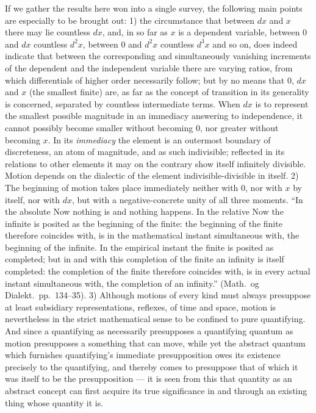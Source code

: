 \documentclass[12pt,a4paper]{book}
\begin{document}
If we gather the results here won into a single survey, the following main
points are especially to be brought out: 1) the
circumstance that between $dx$ and $x$ there may lie countless $dx$,
and, in so far as $x$ is a dependent variable, between $0$ and $dx$
countless $d^2x$, between $0$ and $d^2x$ countless $d^3x$ and so on,
does indeed indicate that between the corresponding and simultaneously
vanishing increments of the dependent and the independent variable
there are varying ratios, from which differentials of higher
order necessarily follow; but by no means that $0$,
$dx$ and $x$ (the smallest finite) are, as far as the concept of transition
in its generality is concerned, separated by countless
intermediate terms. When $dx$ is to represent the smallest possible magnitude
in an immediacy answering to independence, it cannot possibly become smaller
without becoming $0$, nor greater without becoming $x$. In its
\emph{immediacy} the element is an outermost boundary of discreteness, an atom
of magnitude, and as such indivisible; reflected in its relations to other
elements it may on the contrary show itself infinitely divisible. Motion
depends on the dialectic of the element indivisible-divisible in itself.
2) The beginning of motion takes place immediately neither with $0$, nor with
$x$ by itself, nor with $dx$, but with a negative-concrete unity of all three
moments. ``In the absolute Now nothing is and nothing happens. In the relative
Now the infinite is posited as the beginning of the finite: the beginning of
the finite therefore coincides with, is in the mathematical instant
simultaneous with, the beginning of the infinite. In the empirical instant the
finite is posited as completed; but in and with this completion of the finite
an infinity is itself completed: the completion of the finite therefore
coincides with, is in every actual instant simultaneous with, the completion of
an infinity.'' (Math.\ og Dialekt.\ pp.~134--35). 3) Although motions of every
kind must always presuppose at least subsidiary representations, reflexes, of
time and space, motion is nevertheless in the strict mathematical sense to be
confined to pure quantifying. And since a quantifying as necessarily
presupposes a quantifying quantum as motion presupposes a something that can
move,
while yet the abstract quantum which furnishes quantifying's immediate
presupposition owes its existence precisely to the quantifying, and thereby
comes to presuppose that of which it was itself to be the presupposition ---
it is seen from this that quantity as an abstract concept can first acquire its
true significance in and through an existing thing whose quantity it is.
\end{document}
